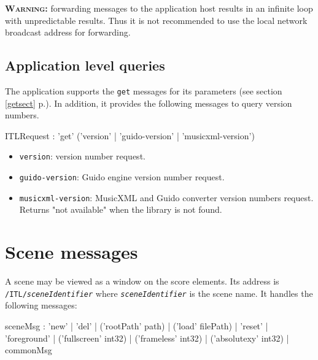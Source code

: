 \documentclass[a4paper,twoside]{report}
\newcommand{\toplevel}[1]	{\chapter{#1}}
\newcommand{\sublevel}[1]	{\section{#1}}
\newcommand{\fullref}[1]	{\ref{#1} p.\pageref{#1}}
\newcommand{\OSC}[1]		{\texttt{#1}}
\newcommand{\warning}[1]	{\textbf{\textsc{Warning:}} #1}
\begin{document}
\warning{forwarding messages to the application host results in an infinite loop with unpredictable results. Thus it is not recommended to use the local network broadcast address for forwarding.}



\sublevel{Application level queries}
\label{ITLQuery}

The application supports the \OSC{get} messages for its parameters (see section \fullref{getsect}). In addition, it provides the following messages to query version numbers.

\begin{rail}
ITLRequest : 'get'  ('version' | 'guido-version' | 'musicxml-version')
\end{rail}

\begin{itemize}
\item \OSC{version}: version number request.
\item \OSC{guido-version}: Guido engine version number request.
\item \OSC{musicxml-version}: MusicXML and Guido converter version numbers request. Returns "not available" when the library is not found.

\end{itemize}



\toplevel{Scene messages}
\label{scene}
A scene may be viewed as a window on the score elements. Its address is \OSC{/ITL/\textit{sceneIdentifier}} where \OSC{\textit{sceneIdentifier}} is the scene name. It handles the following messages:
\begin{rail}
sceneMsg :  'new'
			| 'del'
			| ('rootPath' path) 
			| ('load' filePath)
			| 'reset'
			| 'foreground'
			| ('fullscreen' int32)
			| ('frameless' int32)
			| ('absolutexy' int32)
			| commonMsg
\end{rail}
\end{document}
